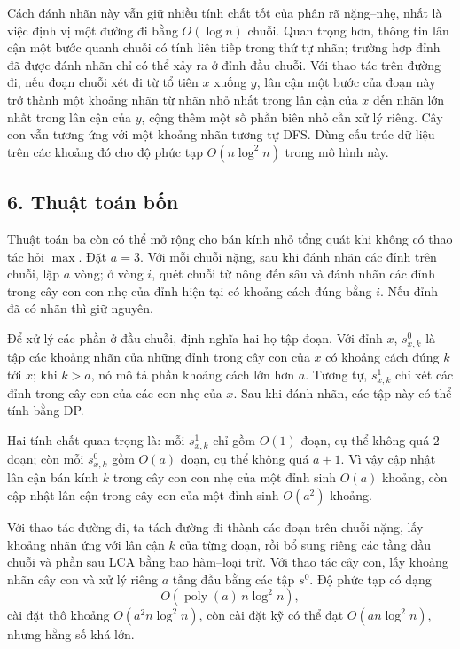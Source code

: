 \documentclass[11pt]{article}
\begin{document}
Cách đánh nhãn này vẫn giữ nhiều tính chất tốt của phân rã nặng--nhẹ, nhất là
việc định vị một đường đi bằng \(O(\log n)\) chuỗi. Quan trọng hơn, thông tin
lân cận một bước quanh chuỗi có tính liên tiếp trong thứ tự nhãn; trường hợp
đỉnh đã được đánh nhãn chỉ có thể xảy ra ở đỉnh đầu chuỗi. Với thao tác trên
đường đi, nếu đoạn chuỗi xét đi từ tổ tiên \(x\) xuống \(y\), lân cận một bước
của đoạn này trở thành một khoảng nhãn từ nhãn nhỏ nhất trong lân cận của \(x\)
đến nhãn lớn nhất trong lân cận của \(y\), cộng thêm một số phần biên nhỏ cần
xử lý riêng. Cây con vẫn tương ứng với một khoảng nhãn tương tự DFS. Dùng cấu
trúc dữ liệu trên các khoảng đó cho độ phức tạp \(O(n\log^2 n)\) trong mô hình
này.

\subsection*{6. Thuật toán bốn}

Thuật toán ba còn có thể mở rộng cho bán kính nhỏ tổng quát khi không có thao
tác hỏi \(\max\). Đặt \(a=3\). Với mỗi chuỗi nặng, sau khi đánh nhãn các đỉnh
trên chuỗi, lặp \(a\) vòng; ở vòng \(i\), quét chuỗi từ nông đến sâu và đánh
nhãn các đỉnh trong cây con con nhẹ của đỉnh hiện tại có khoảng cách đúng bằng
\(i\). Nếu đỉnh đã có nhãn thì giữ nguyên.

Để xử lý các phần ở đầu chuỗi, định nghĩa hai họ tập đoạn. Với đỉnh \(x\),
\(s^0_{x,k}\) là tập các khoảng nhãn của những đỉnh trong cây con của \(x\) có
khoảng cách đúng \(k\) tới \(x\); khi \(k>a\), nó mô tả phần khoảng cách lớn
hơn \(a\). Tương tự, \(s^1_{x,k}\) chỉ xét các đỉnh trong cây con của các con
nhẹ của \(x\). Sau khi đánh nhãn, các tập này có thể tính bằng DP.

Hai tính chất quan trọng là: mỗi \(s^1_{x,k}\) chỉ gồm \(O(1)\) đoạn, cụ thể
không quá \(2\) đoạn; còn mỗi \(s^0_{x,k}\) gồm \(O(a)\) đoạn, cụ thể không quá
\(a+1\). Vì vậy cập nhật lân cận bán kính \(k\) trong cây con con nhẹ của một
đỉnh sinh \(O(a)\) khoảng, còn cập nhật lân cận trong cây con của một đỉnh sinh
\(O(a^2)\) khoảng.

Với thao tác đường đi, ta tách đường đi thành các đoạn trên chuỗi nặng, lấy
khoảng nhãn ứng với lân cận \(k\) của từng đoạn, rồi bổ sung riêng các tầng đầu
chuỗi và phần sau LCA bằng bao hàm--loại trừ. Với thao tác cây con, lấy khoảng
nhãn cây con và xử lý riêng \(a\) tầng đầu bằng các tập \(s^0\). Độ phức tạp có
dạng
\[
  O(\operatorname{poly}(a)\,n\log^2 n),
\]
cài đặt thô khoảng \(O(a^2n\log^2 n)\), còn cài đặt kỹ có thể đạt
\(O(an\log^2 n)\), nhưng hằng số khá lớn.
\end{document}
